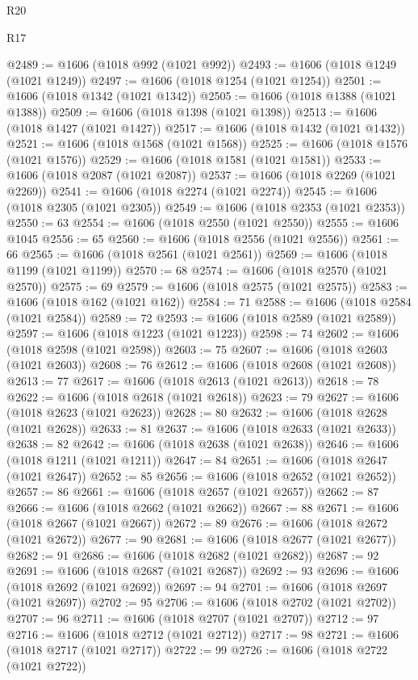 \begin{lexlean}{R20}
\begin{lexlean}{R17}
\begin{coremodule}
{{{{{{{{{{{{{{{{{{{{{{{{{{{{{{{{{{{{{{{{{{{{{{{{{{{{{{{{{{{{{{{{{{{{{{{{{{{{{{{{{{{{{{{{{{{{{{{{{{{{{{{{{{{@2489 := @1606 (@1018 @992 (@1021 @992))
@2493 := @1606 (@1018 @1249 (@1021 @1249))
@2497 := @1606 (@1018 @1254 (@1021 @1254))
@2501 := @1606 (@1018 @1342 (@1021 @1342))
@2505 := @1606 (@1018 @1388 (@1021 @1388))
@2509 := @1606 (@1018 @1398 (@1021 @1398))
@2513 := @1606 (@1018 @1427 (@1021 @1427))
@2517 := @1606 (@1018 @1432 (@1021 @1432))
@2521 := @1606 (@1018 @1568 (@1021 @1568))
@2525 := @1606 (@1018 @1576 (@1021 @1576))
@2529 := @1606 (@1018 @1581 (@1021 @1581))
@2533 := @1606 (@1018 @2087 (@1021 @2087))
@2537 := @1606 (@1018 @2269 (@1021 @2269))
@2541 := @1606 (@1018 @2274 (@1021 @2274))
@2545 := @1606 (@1018 @2305 (@1021 @2305))
@2549 := @1606 (@1018 @2353 (@1021 @2353))
@2550 := 63
@2554 := @1606 (@1018 @2550 (@1021 @2550))
@2555 := @1606 @1045
@2556 := 65
@2560 := @1606 (@1018 @2556 (@1021 @2556))
@2561 := 66
@2565 := @1606 (@1018 @2561 (@1021 @2561))
@2569 := @1606 (@1018 @1199 (@1021 @1199))
@2570 := 68
@2574 := @1606 (@1018 @2570 (@1021 @2570))
@2575 := 69
@2579 := @1606 (@1018 @2575 (@1021 @2575))
@2583 := @1606 (@1018 @162 (@1021 @162))
@2584 := 71
@2588 := @1606 (@1018 @2584 (@1021 @2584))
@2589 := 72
@2593 := @1606 (@1018 @2589 (@1021 @2589))
@2597 := @1606 (@1018 @1223 (@1021 @1223))
@2598 := 74
@2602 := @1606 (@1018 @2598 (@1021 @2598))
@2603 := 75
@2607 := @1606 (@1018 @2603 (@1021 @2603))
@2608 := 76
@2612 := @1606 (@1018 @2608 (@1021 @2608))
@2613 := 77
@2617 := @1606 (@1018 @2613 (@1021 @2613))
@2618 := 78
@2622 := @1606 (@1018 @2618 (@1021 @2618))
@2623 := 79
@2627 := @1606 (@1018 @2623 (@1021 @2623))
@2628 := 80
@2632 := @1606 (@1018 @2628 (@1021 @2628))
@2633 := 81
@2637 := @1606 (@1018 @2633 (@1021 @2633))
@2638 := 82
@2642 := @1606 (@1018 @2638 (@1021 @2638))
@2646 := @1606 (@1018 @1211 (@1021 @1211))
@2647 := 84
@2651 := @1606 (@1018 @2647 (@1021 @2647))
@2652 := 85
@2656 := @1606 (@1018 @2652 (@1021 @2652))
@2657 := 86
@2661 := @1606 (@1018 @2657 (@1021 @2657))
@2662 := 87
@2666 := @1606 (@1018 @2662 (@1021 @2662))
@2667 := 88
@2671 := @1606 (@1018 @2667 (@1021 @2667))
@2672 := 89
@2676 := @1606 (@1018 @2672 (@1021 @2672))
@2677 := 90
@2681 := @1606 (@1018 @2677 (@1021 @2677))
@2682 := 91
@2686 := @1606 (@1018 @2682 (@1021 @2682))
@2687 := 92
@2691 := @1606 (@1018 @2687 (@1021 @2687))
@2692 := 93
@2696 := @1606 (@1018 @2692 (@1021 @2692))
@2697 := 94
@2701 := @1606 (@1018 @2697 (@1021 @2697))
@2702 := 95
@2706 := @1606 (@1018 @2702 (@1021 @2702))
@2707 := 96
@2711 := @1606 (@1018 @2707 (@1021 @2707))
@2712 := 97
@2716 := @1606 (@1018 @2712 (@1021 @2712))
@2717 := 98
@2721 := @1606 (@1018 @2717 (@1021 @2717))
@2722 := 99
@2726 := @1606 (@1018 @2722 (@1021 @2722))
}}}}}}}}}}}}}}}}}}}}}}}}}}}}}}}}}}}}}}}}}}}}}}}}}}}}}}}}}}}}}}}}}}}}}}}}}}}}}}}}}}}}}}}}}}}}}}}}}}}}}}}}}}}
\end{coremodule}
\end{lexlean}
\end{lexlean}
